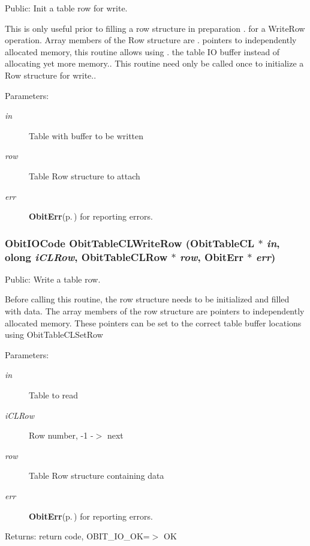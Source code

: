 Public: Init a table row for write. 

This is only useful prior to filling a row structure in preparation . for a Write\-Row operation. Array members of the Row structure are . pointers to independently allocated memory, this routine allows using . the table IO buffer instead of allocating yet more memory.. This routine need only be called once to initialize a Row structure for write.. \begin{Desc}
\item[Parameters:]
\begin{description}
\item[{\em in}]Table with buffer to be written \item[{\em row}]Table Row structure to attach \item[{\em err}]{\bf Obit\-Err}{\rm (p.\,\pageref{structObitErr})} for reporting errors. \end{description}
\end{Desc}
\subsubsection{\setlength{\rightskip}{0pt plus 5cm}Obit\-IOCode Obit\-Table\-CLWrite\-Row ({\bf Obit\-Table\-CL} $\ast$ {\em in}, {\bf olong} {\em i\-CLRow}, {\bf Obit\-Table\-CLRow} $\ast$ {\em row}, {\bf Obit\-Err} $\ast$ {\em err})}\label{ObitTableCL_8h_a20}


Public: Write a table row. 

Before calling this routine, the row structure needs to be initialized and filled with data. The array members of the row structure are pointers to independently allocated memory. These pointers can be set to the correct table buffer locations using Obit\-Table\-CLSet\-Row \begin{Desc}
\item[Parameters:]
\begin{description}
\item[{\em in}]Table to read \item[{\em i\-CLRow}]Row number, -1 -$>$ next \item[{\em row}]Table Row structure containing data \item[{\em err}]{\bf Obit\-Err}{\rm (p.\,\pageref{structObitErr})} for reporting errors. \end{description}
\end{Desc}
\begin{Desc}
\item[Returns:]return code, OBIT\_\-IO\_\-OK=$>$ OK \end{Desc}
